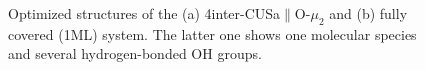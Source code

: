 \documentclass[11pt,DIV=13,BCOR=5mm,a4paper,headinclude]{scrbook}
\begin{document}
 \begin{figure}[!ht]
 \centering
{}
 \quad\quad
 \caption{Optimized structures of the (a) 4inter-CUSa$\parallel$O-$\mu_2$ and (b) fully covered (1ML) system.
The latter one shows one molecular species and several hydrogen-bonded OH groups.}
        \label{abb:4+fully}
 \end{figure}
\end{document}
